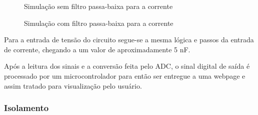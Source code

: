 \begin{figure}[htb!]
    \caption{Simulação sem filtro passa-baixa para a corrente}
    \vspace*{5mm}
    \label{fig:simco1}
    \fonte{}
\end{figure}

\begin{figure}[htb!]
    \caption{Simulação com filtro passa-baixa para a corrente}
    \vspace*{5mm}
    \label{fig:simco2}
    \fonte{}
\end{figure}

Para a entrada de tensão do circuito segue-se a mesma lógica e passos da entrada de corrente, chegando a um valor de aproximadamente 5 nF.

Após a leitura dos sinais e a conversão feita pelo ADC, o sinal digital de saída é processado por um microcontrolador para então ser entregue a uma webpage e assim tratado para visualização pelo usuário. 

\subsubsection{Isolamento}\label{isolamento-metodologia}

